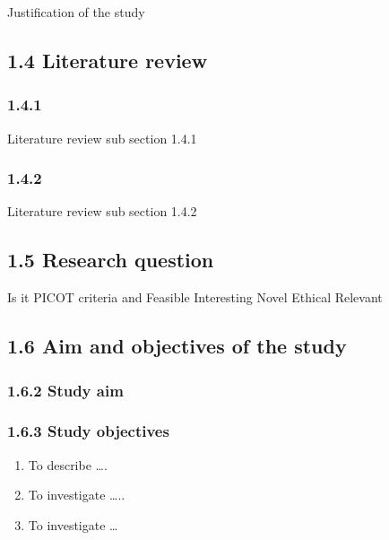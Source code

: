 \documentclass[12pt,]{article}
\begin{document}
Justification of the study

\subsection{1.4 Literature review}\label{literature-review}

\subsubsection{1.4.1}\label{section-3}

Literature review sub section 1.4.1

\subsubsection{1.4.2}\label{section-4}

Literature review sub section 1.4.2

\subsection{1.5 Research question}\label{research-question}

Is it PICOT criteria and Feasible Interesting Novel Ethical Relevant

\subsection{1.6 Aim and objectives of the
study}\label{aim-and-objectives-of-the-study}

\subsubsection{1.6.2 Study aim}\label{study-aim}

\subsubsection{1.6.3 Study objectives}\label{study-objectives}

\begin{enumerate}
\def\labelenumi{\alph{enumi})}
\item
  To describe \ldots{}.
\item
  To investigate \ldots{}..
\item
  To investigate \ldots{}
\end{enumerate}

\newpage

\addtocounter{section}{1}
\end{document}
